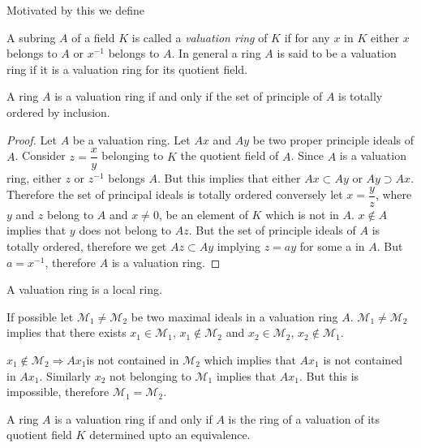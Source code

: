 Motivated by this we define

A subring $A$ of a field $K$ is called a \textit{valuation ring} of
$K$ if for any $x$ in $K$ either $x$ belongs to $A$ or $x^{-1}$
belongs to $A$. In general a ring $A$ is said to be a valuation ring
if it is a valuation ring for its quotient field. 

\begin{prop}\label{part1:chap1:sec2:prop3}
  A ring $A$ is a valuation ring if and only if the set of principle
  of $A$ is totally ordered by inclusion. 
\end{prop}

\begin{proof}
  Let $A$ be a valuation ring. Let $Ax$  and $Ay$ be two proper
  principle ideals of $A$. Consider $z = \dfrac{x}{y}$ belonging to $K$
  the quotient field of $A$. Since $A$ is a valuation ring, either $z$
  or $z^{-1}$ belongs $A$. But this implies that either $Ax \subset
  Ay$ or $Ay \supset Ax$. Therefore the set of principal ideals is
  totally ordered conversely let $x = \dfrac{y}{z}$, where $y$ and $z$
  belong to $A$ and $x \neq 0$, be an element of $K$ which is
  not in $A$. $x \notin A$ implies that $y$ does not belong to $Az$. But
  the set of principle ideals of $A$ is totally ordered, therefore we
  get $Az \subset Ay$ implying $z = ay$ for some a in $A$. But  $a =
  x^{-1}$, therefore $A$ is a valuation ring.  
\end{proof}

\begin{coro*}
  A valuation ring is a local ring.  

  If possible let $\mathcal{M}_1 \neq \mathcal{M}_2 $ be two maximal
  ideals in a valuation ring $A$. $\mathcal{M}_1 \neq \mathcal{M}_2 $
  implies that there exists  $x_1 \in \mathcal{M}_1$, $x_1 \notin
  \mathcal{M}_2$ and $x_2 \in \mathcal{M}_2$, $x_2 \notin
  \mathcal{M}_1$. 
  
  $x_1 \notin \mathcal{M}_2 \Longrightarrow Ax_1$\pageoriginale is not contained
  in $\mathcal{M}_2$ which implies that $Ax_1 $ is not contained in
  $Ax_1$. Similarly $x_2$ not belonging to $\mathcal{M}_1$ implies
  that $Ax_1$. But this is impossible, therefore $\mathcal{M}_1 =
  \mathcal{M}_2$. 
\end{coro*}

\begin{prop}\label{part1:chap1:sec2:prop4} 
  A ring $A$ is a valuation ring if and only if $A$ is the ring of a
  valuation of its quotient field $K$ determined upto an equivalence. 
\end{prop}

